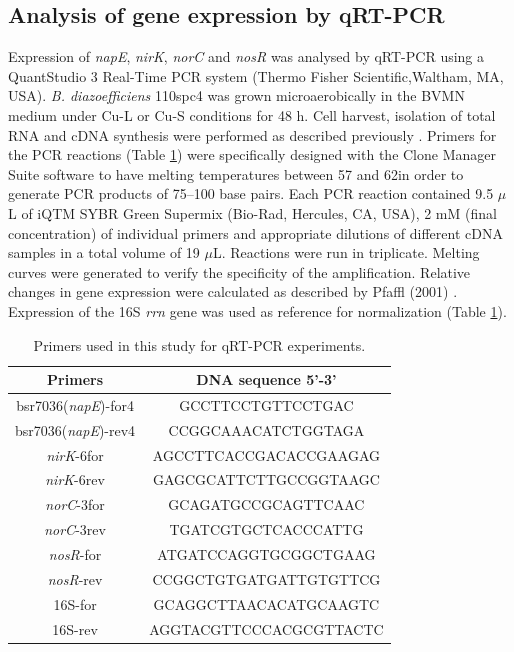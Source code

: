 \documentclass[a4paper,11pt]{article}
\begin{document}
\subsection{Analysis of gene expression by qRT-PCR}
Expression of {\em napE}, {\em nirK}, {\em norC} and {\em nosR} was analysed by qRT-PCR using a QuantStudio
3 Real-Time PCR system (Thermo Fisher Scientific,Waltham, MA, USA). {\em B. diazoefficiens}
110spc4 was grown microaerobically in the BVMN medium under Cu-L or Cu-S conditions
for 48 h. Cell harvest, isolation of total RNA and cDNA synthesis were performed as
described previously \cite{mesa2003bradyrhizobium}. Primers for the PCR reactions (Table \ref{tab:table2}) were specifically designed
with the Clone Manager Suite software to have melting temperatures between 57 and
62\textcelsius in order to generate PCR products of 75–100 base pairs. Each PCR reaction contained 9.5 $\mu$L of
iQTM SYBR Green Supermix (Bio-Rad, Hercules, CA, USA), 2 mM (final concentration) of
individual primers and appropriate dilutions of different cDNA samples in a total volume
of 19 $\mu$L. Reactions were run in triplicate. Melting curves were generated to verify the
specificity of the amplification. Relative changes in gene expression were calculated as
described by Pfaffl (2001) \cite{pfaffl2002relative}. Expression of the 16S {\em rrn} gene was used as reference for
normalization (Table \ref{tab:table2}).

\begin{table}[h!]
\centering
\caption{Primers used in this study for qRT-PCR experiments.}
\begin{tabular}{|c|c|}
\hline
\textbf{Primers} & \textbf{DNA sequence 5'-3'} \\
\hline
bsr7036({\em napE})-for4 & GCCTTCCTGTTCCTGAC \\
\hline
bsr7036({\em napE})-rev4 & CCGGCAAACATCTGGTAGA \\
\hline
{\em nirK}-6for & AGCCTTCACCGACACCGAAGAG \\
\hline
{\em nirK}-6rev & GAGCGCATTCTTGCCGGTAAGC \\
\hline
{\em norC}-3for & GCAGATGCCGCAGTTCAAC \\
\hline
{\em norC}-3rev & TGATCGTGCTCACCCATTG \\
\hline
{\em nosR}-for & ATGATCCAGGTGCGGCTGAAG \\
\hline
{\em nosR}-rev & CCGGCTGTGATGATTGTGTTCG \\
\hline
16S-for & GCAGGCTTAACACATGCAAGTC \\
\hline
16S-rev & AGGTACGTTCCCACGCGTTACTC \\
\hline
\end{tabular}
\label{tab:table2}
\end{table}
\end{document}
